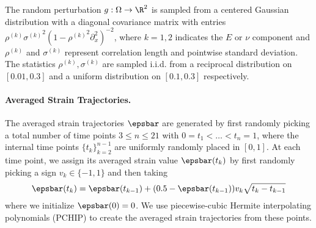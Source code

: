 \documentclass[letterpaper,11pt]{article}
\begin{document}
The random perturbation $g: \Omega \to \R^2$ is sampled from a centered Gaussian distribution with a diagonal covariance matrix with entries $\rho^{(k)}{\sigma^{(k)}}^2(1 - {\rho^{(k)}}^2\partial_x^2)^{-2}$, where $k = 1, 2$ indicates the $E$ or $\nu$ component and $\rho^{(k)}$ and $\sigma^{(k)}$ represent correlation length and pointwise standard deviation. The statistics $\rho^{(k)}, \sigma^{(k)}$ are sampled i.i.d. from a reciprocal distribution on $[0.01, 0.3]$ and a uniform distribution on $[0.1, 0.3]$ respectively.

\paragraph{Averaged Strain Trajectories.} The averaged strain trajectories $\epsbar$ are generated by first randomly picking a total number of time points $3\leq n\leq 21$ with $0=t_1<\dots<t_{n}=1$, where the internal time points $\{t_k\}_{k=2}^{n-1}$ are uniformly randomly placed in $[0,1]$. At each time point, we assign its averaged strain value $\epsbar(t_{k})$ by first randomly picking a sign $v_k\in\{-1, 1\}$ and then taking
\begin{equation}
    \epsbar(t_{k}) = \epsbar(t_{k-1}) + (0.5-\epsbar(t_{k-1}))v_k\sqrt{t_{k}-t_{k-1}}
\end{equation}
where we initialize $\epsbar(0) = 0$. We use piecewise-cubic Hermite interpolating polynomials (PCHIP) to create the averaged strain trajectories from these points.
\end{document}
